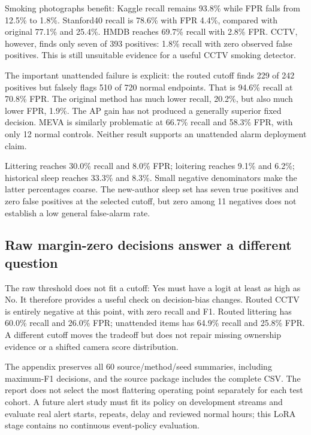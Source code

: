 Smoking photographs benefit: Kaggle recall remains 93.8\% while FPR falls from 12.5\% to 1.8\%. Stanford40 recall is 78.6\% with FPR 4.4\%, compared with original 77.1\% and 25.4\%. HMDB reaches 69.7\% recall with 2.8\% FPR. CCTV, however, finds only seven of 393 positives: 1.8\% recall with zero observed false positives. This is still unsuitable evidence for a useful CCTV smoking detector.

The important unattended failure is explicit: the routed cutoff finds 229 of 242 positives but falsely flags 510 of 720 normal endpoints. That is 94.6\% recall at 70.8\% FPR. The original method has much lower recall, 20.2\%, but also much lower FPR, 1.9\%. The AP gain has not produced a generally superior fixed decision. MEVA is similarly problematic at 66.7\% recall and 58.3\% FPR, with only 12 normal controls. Neither result supports an unattended alarm deployment claim.

Littering reaches 30.0\% recall and 8.0\% FPR; loitering reaches 9.1\% and 6.2\%; historical sleep reaches 33.3\% and 8.3\%. Small negative denominators make the latter percentages coarse. The new-author sleep set has seven true positives and zero false positives at the selected cutoff, but zero among 11 negatives does not establish a low general false-alarm rate.

\subsection{Raw margin-zero decisions answer a different question}

The raw threshold does not fit a cutoff: Yes must have a logit at least as high as No. It therefore provides a useful check on decision-bias changes. Routed CCTV is entirely negative at this point, with zero recall and F1. Routed littering has 60.0\% recall and 26.0\% FPR; unattended items has 64.9\% recall and 25.8\% FPR. A different cutoff moves the tradeoff but does not repair missing ownership evidence or a shifted camera score distribution.

The appendix preserves all 60 source/method/seed summaries, including maximum-F1 decisions, and the source package includes the complete CSV. The report does not select the most flattering operating point separately for each test cohort. A future alert study must fit its policy on development streams and evaluate real alert starts, repeats, delay and reviewed normal hours; this LoRA stage contains no continuous event-policy evaluation.

